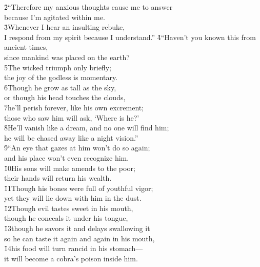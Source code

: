 \begin{poetry}
\poeml \v{2}``Therefore my anxious thoughts cause me to answer \\
\poemll    because I'm agitated within me. \\
\poeml \v{3}Whenever I hear an insulting rebuke, \\
\poemll    I respond from my spirit because I understand.''
\poeml \v{4}``Haven't you known this from ancient times, \\
\poemll    since mankind was placed on the earth? \\
\poeml \v{5}The wicked triumph only briefly; \\
\poemll    the joy of the godless is momentary. \\
\poeml \v{6}Though he grow as tall as the sky, \\
\poemll    or though his head touches the clouds, \\
\poeml \v{7}he'll perish forever, like his own excrement; \\
\poemll    those who saw him will ask, `Where is he?' \\
\poeml \v{8}He'll vanish like a dream, and no one will find him; \\
\poemll    he will be chased away like a night vision.'' \\
\poeml \v{9}``An eye that gazes at him won't do so again; \\
\poemll    and his place won't even recognize him. \\
\poeml \v{10}His sons will make amends to the poor; \\
\poemll    their hands will return his wealth. \\
\poeml \v{11}Though his bones were full of youthful vigor; \\
\poemll    yet they will lie down with him in the dust. \\
\poeml \v{12}Though evil tastes sweet in his mouth, \\
\poemll    though he conceals it under his tongue, \\
\poeml \v{13}though he savors it and delays swallowing it \\
\poemll    so he can taste it again and again in his mouth, \\
\poeml \v{14}his food will turn rancid in his stomach--- \\
\poemll    it will become a cobra's poison inside him. \\

\end{poetry}
